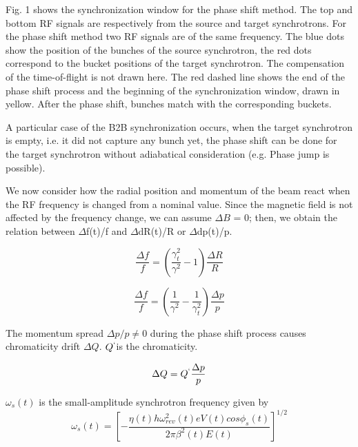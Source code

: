 Fig. 1 shows the synchronization window for the phase shift method. The top and bottom RF signals are respectively from the source and target synchrotrons. For the phase shift method two RF signals are of the same frequency. The blue dots show the position of the bunches of the source synchrotron, the red dots correspond to the bucket positions of the target synchrotron. The compensation of the time-of-flight is not drawn here. The red dashed line shows the end of the phase shift process and the beginning of the synchronization window, drawn in yellow. After the phase shift, bunches match with the corresponding buckets.  

A particular case of the B2B synchronization occurs, when the target synchrotron is empty, i.e. it did not capture any bunch yet, the phase shift can be done for the target synchrotron without adiabatical consideration (e.g. Phase jump is possible).

We now consider how the radial position and momentum of the beam react when the RF frequency is changed from a nominal value. Since the magnetic field is not affected by the frequency change, we can assume $\Delta{B}$ = 0; then, we obtain the relation between $\Delta$f(t)/f and $\Delta$dR(t)/R or $\Delta$dp(t)/p. 

\begin{equation}
\label{eq:phaseR}
\frac{\Delta{f}}{f} =({\frac{\gamma_t^2}{\gamma^2}-1}) \frac{\Delta{R}}{R}
\end{equation}

\begin{equation}
\frac{\Delta{f}}{f} = (\frac{1}{\gamma^2}-\frac{1}{\gamma_t^2})\frac{\Delta{p}}{p}
\label{eq:phaseP}
\end{equation}


The momentum spread ${\Delta{p}}/{p} \neq 0$ during the phase shift process causes chromaticity drift $\Delta{Q}$. $Q^`$is the chromaticity.

\begin{equation}
\Delta{Q} = Q^`\frac{\Delta{p}}{p}
\label{eq:chromaticity}
\end{equation} 

$\omega_s(t)$ is the small-amplitude synchrotron frequency given by
\begin{equation}
\omega_s(t) =[{-\frac{\eta(t)h\omega_{rev}^2(t)eV(t)cos{\phi_s(t)}}{2\pi\beta^2(t)E(t)}}]^{1/2}
\label{eq:synchfreq}
\end{equation} 

